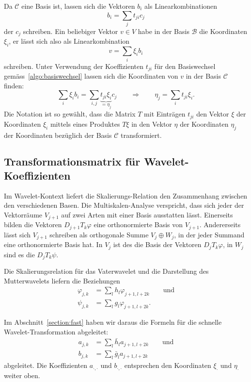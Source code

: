 Da $\mathcal{C}$ eine Basis ist, lassen sich die Vektoren $b_i$ als
Linearkombinationen
\begin{equation}
b_i = \sum_{j}  t_{ji}c_j
\label{algo:basiswechsel}
\end{equation}
der $c_j$ schreiben.
Ein beliebiger Vektor $v\in V$ habe in der Basis $\mathcal{B}$ die
Koordinaten $\xi_i$, er lässt sich also als Linearkombination
\[
v=\sum_{i} \xi_i b_i
\]
schreiben.
Unter Verwendung der Koeffizienten $t_{ji}$ für den Basiswechsel
gemäss~\eqref{algo:basiswechsel} lassen
sich die Koordinaten von $v$ in der Basis $\mathcal{C}$ finden:
\[
\sum_{i} \xi_i b_i
=
\sum_{i,j} \underbrace{t_{ji}\xi_i}_{\displaystyle=\eta_j} c_j
\qquad\Rightarrow\qquad
\eta_j = \sum_{i} t_{ji} \xi _i.
\]
Die Notation ist so gewählt, dass die Matrix $T$ mit Einträgen $t_{ji}$ 
den Vektor $\xi$ der Koordinaten $\xi_i$ mittels eines Produktes $T\xi$
in den Vektor $\eta$ der Koordinaten $\eta_j$ der Koordinaten bezüglich
der Basis $\mathcal{C}$ transformiert.

\subsection{Transformationsmatrix für Wavelet-Koeffizienten}
Im Wavelet-Kontext liefert die Skalierungs-Relation den Zusammenhang
zwischen den verschiedenen Basen.
Die Multiskalen-Analyse verspricht, dass sich jeder der Vektorräume
$V_{j+1}$ auf zwei Arten mit einer Basis ausstatten lässt.
Einerseits bilden die Vektoren $D_{j+1}T_k\varphi$ eine orthonormierte
Basis von $V_{j+1}$.
Andererseits lässt sich $V_{j+1}$ schreiben als orthogonale Summe
$V_j\oplus W_j$, in der jeder Summand eine orthonormierte Basis hat.
In $V_j$ ist des die Basis der Vektoren $D_jT_k\varphi$, in $W_j$
sind es die $D_jT_k\psi$.

Die Skalierungsrelation für das Vaterwavelet und die Darstellung des
Mutterwavelets liefern die Beziehungen
\begin{align*}
\varphi_{j,k} &= \sum_{l} h_{l}\varphi_{j+1,l+2k}
\qquad\text{und}
\\
\psi_{j,k} &= \sum_{l} g_{l} \varphi_{j+1,l+2k}.
\end{align*}

Im Abschnitt~\ref{section:fast} haben wir daraus die Formeln für
die schnelle Wavelet-Transformation abgeleitet:
\begin{align*}
a_{j,k} &= \sum_{l} \bar{h}_l a_{j+1,l+2k} \qquad\text{und}
\\
b_{j,k} &= \sum_{l} \bar{g}_l a_{j+1,l+2k}
\end{align*}
abgeleitet.
Die Koeffizienten $a_{\cdot,\cdot}$ und $b_{\cdot,\cdot}$ entsprechen
den Koordinaten $\xi_{\cdot}$ und $\eta_{\cdot}$ weiter oben.

